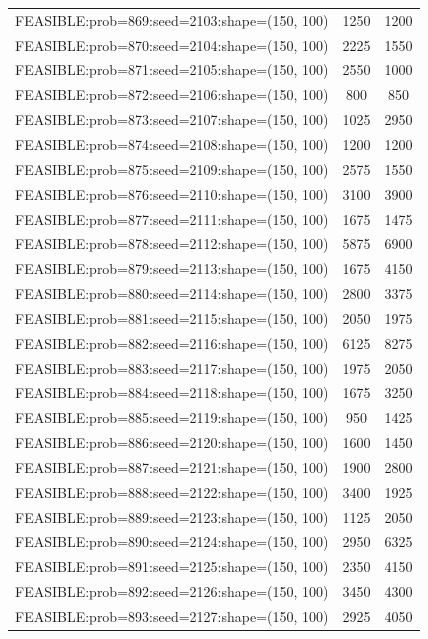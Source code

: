 \begin{longtable}{lcc}
FEASIBLE:prob=869:seed=2103:shape=(150, 100) &     1250 &  1200 \\
FEASIBLE:prob=870:seed=2104:shape=(150, 100) &     2225 &  1550 \\
FEASIBLE:prob=871:seed=2105:shape=(150, 100) &     2550 &  1000 \\
FEASIBLE:prob=872:seed=2106:shape=(150, 100) &      800 &   850 \\
FEASIBLE:prob=873:seed=2107:shape=(150, 100) &     1025 &  2950 \\
FEASIBLE:prob=874:seed=2108:shape=(150, 100) &     1200 &  1200 \\
FEASIBLE:prob=875:seed=2109:shape=(150, 100) &     2575 &  1550 \\
FEASIBLE:prob=876:seed=2110:shape=(150, 100) &     3100 &  3900 \\
FEASIBLE:prob=877:seed=2111:shape=(150, 100) &     1675 &  1475 \\
FEASIBLE:prob=878:seed=2112:shape=(150, 100) &     5875 &  6900 \\
FEASIBLE:prob=879:seed=2113:shape=(150, 100) &     1675 &  4150 \\
FEASIBLE:prob=880:seed=2114:shape=(150, 100) &     2800 &  3375 \\
FEASIBLE:prob=881:seed=2115:shape=(150, 100) &     2050 &  1975 \\
FEASIBLE:prob=882:seed=2116:shape=(150, 100) &     6125 &  8275 \\
FEASIBLE:prob=883:seed=2117:shape=(150, 100) &     1975 &  2050 \\
FEASIBLE:prob=884:seed=2118:shape=(150, 100) &     1675 &  3250 \\
FEASIBLE:prob=885:seed=2119:shape=(150, 100) &      950 &  1425 \\
FEASIBLE:prob=886:seed=2120:shape=(150, 100) &     1600 &  1450 \\
FEASIBLE:prob=887:seed=2121:shape=(150, 100) &     1900 &  2800 \\
FEASIBLE:prob=888:seed=2122:shape=(150, 100) &     3400 &  1925 \\
FEASIBLE:prob=889:seed=2123:shape=(150, 100) &     1125 &  2050 \\
FEASIBLE:prob=890:seed=2124:shape=(150, 100) &     2950 &  6325 \\
FEASIBLE:prob=891:seed=2125:shape=(150, 100) &     2350 &  4150 \\
FEASIBLE:prob=892:seed=2126:shape=(150, 100) &     3450 &  4300 \\
FEASIBLE:prob=893:seed=2127:shape=(150, 100) &     2925 &  4050 \\

\end{longtable}
